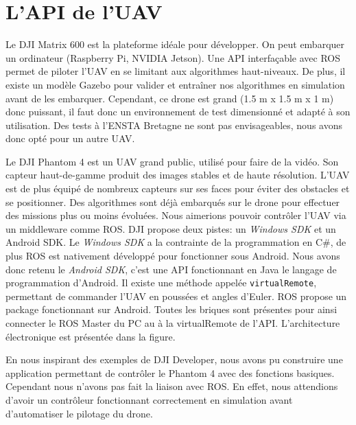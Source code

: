 \section{L'API de l'UAV}

Le DJI Matrix 600 est la plateforme idéale pour développer. On peut embarquer un
ordinateur (Raspberry Pi, NVIDIA Jetson). Une API interfaçable avec ROS permet de
piloter l’UAV en se limitant aux algorithmes haut-niveaux. De plus, il existe un modèle
Gazebo pour valider et entraîner nos algorithmes en simulation avant de les embarquer.
Cependant, ce drone est grand (1.5 m x 1.5 m x 1 m) donc puissant, il faut donc un
environnement de test dimensionné et adapté à son utilisation. Des tests à l’ENSTA
Bretagne ne sont pas envisageables, nous avons donc opté pour un autre UAV. 

Le DJI Phantom 4 est un UAV grand public, utilisé pour faire de la vidéo. Son capteur
haut-de-gamme produit des images stables et de haute résolution. L’UAV est de plus
équipé de nombreux capteurs sur ses faces pour éviter des obstacles et se positionner.
Des algorithmes sont déjà embarqués sur le drone pour effectuer des missions plus ou
moins évoluées. Nous aimerions pouvoir contrôler l’UAV via un middleware comme
ROS. DJI propose deux pistes: un \textit{Windows SDK} et un Android SDK. Le \textit{Windows SDK}
a la contrainte de la programmation en C\#, de plus ROS est nativement développé pour
fonctionner sous Android. Nous avons donc retenu le \textit{Android SDK}, c’est une API
fonctionnant en Java le langage de programmation d’Android. Il existe une méthode
appelée \texttt{virtualRemote}, permettant de commander l’UAV en poussées et angles
d’Euler.
ROS propose un package fonctionnant sur Android. Toutes les briques sont présentes
pour ainsi connecter le ROS Master du PC au à la virtualRemote de l’API. L’architecture
électronique est présentée dans la figure.

En nous inspirant des exemples de DJI Developer, nous avons pu construire une
application permettant de contrôler le Phantom 4 avec des fonctions basiques.
Cependant nous n’avons pas fait la liaison avec ROS. En effet, nous attendions d’avoir
un contrôleur fonctionnant correctement en simulation avant d’automatiser le pilotage
du drone.

